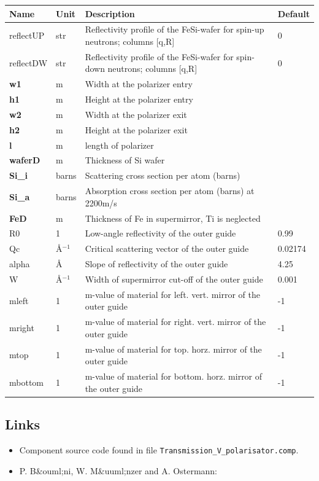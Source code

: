 \begin{longtable}{p{}p{}p{}p{}}
\toprule
\textbf{Name} & \textbf{Unit} & \textbf{Description} & \textbf{Default} \\
\midrule
\endhead
reflectUP & str & Reflectivity profile of the FeSi-wafer for spin-up neutrons; columns [q,R] & 0 \\
reflectDW & str & Reflectivity profile of the FeSi-wafer for spin-down neutrons; columns [q,R] & 0 \\
\textbf{w1} & m & Width at the polarizer entry &  \\
\textbf{h1} & m & Height at the polarizer entry &  \\
\textbf{w2} & m & Width at the polarizer exit &  \\
\textbf{h2} & m & Height at the polarizer exit &  \\
\textbf{l} & m & length of polarizer &  \\
\textbf{waferD} & m & Thickness of Si wafer &  \\
\textbf{Si\_i} & barns & Scattering cross section per atom (barns) &  \\
\textbf{Si\_a} & barns & Absorption cross section per atom (barns) at 2200m/s &  \\
\textbf{FeD} & m & Thickness of Fe in supermirror, Ti is neglected &  \\
R0 & 1 & Low-angle reflectivity of the outer guide & 0.99 \\
Qc & \AA{}$^{-1}$ & Critical scattering vector of the outer guide & 0.02174 \\
alpha & \AA{} & Slope of reflectivity of the outer guide & 4.25 \\
W & \AA{}$^{-1}$ & Width of supermirror cut-off of the outer guide & 0.001 \\
mleft & 1 & m-value of material for left.   vert. mirror of the outer guide & -1 \\
mright & 1 & m-value of material for right.  vert. mirror of the outer guide & -1 \\
mtop & 1 & m-value of material for top.    horz. mirror of the outer guide & -1 \\
mbottom & 1 & m-value of material for bottom. horz. mirror of the outer guide & -1 \\
\bottomrule
\end{longtable}

\subsection*{Links}
\begin{itemize}
  \item Component source code found in file \texttt{Transmission\_V\_polarisator.comp}.
  \item P. B\&ouml;ni, W. M\&uuml;nzer and A. Ostermann: 
\end{itemize}
